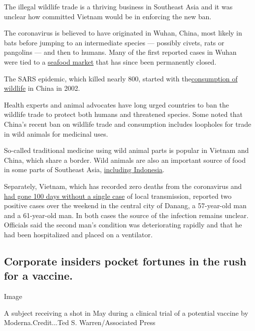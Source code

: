 The illegal wildlife trade is a thriving business in Southeast Asia and
it was unclear how committed Vietnam would be in enforcing the new ban.

The coronavirus is believed to have originated in Wuhan, China, most
likely in bats before jumping to an intermediate species --- possibly
civets, rats or pangolins --- and then to humans. Many of the first
reported cases in Wuhan were tied to a
\href{https://www.nytimes3xbfgragh.onion/2020/02/01/world/asia/china-coronavirus.html}{seafood
market} that has since been permanently closed.

The SARS epidemic, which killed nearly 800, started with
the\href{https://www.nytimes3xbfgragh.onion/2020/02/19/health/coronavirus-animals-markets.html}{consumption
of wildlife} in China in 2002.

Health experts and animal advocates have long urged countries to ban the
wildlife trade to protect both humans and threatened species. Some noted
that China's recent ban on wildlife trade and consumption includes
loopholes for trade in wild animals for medicinal uses.

So-called traditional medicine using wild animal parts is popular in
Vietnam and China, which share a border. Wild animals are also an
important source of food in some parts of Southeast Asia,
\href{https://www.nytimes3xbfgragh.onion/2020/05/13/world/asia/coronavirus-bats-market-Indonesia.html}{including
Indonesia}.

Separately, Vietnam, which has recorded zero deaths from the coronavirus
and
\href{https://www.nytimes3xbfgragh.onion/2020/07/25/world/asia/coronavirus-vietnam.html}{had
gone 100 days without a single case} of local transmission, reported two
positive cases over the weekend in the central city of Danang, a
57-year-old man and a 61-year-old man. In both cases the source of the
infection remains unclear. Officials said the second man's condition was
deteriorating rapidly and that he had been hospitalized and placed on a
ventilator.

\hypertarget{corporate-insiders-pocket-fortunes-in-the-rush-for-a-vaccine}{%
\subsection{Corporate insiders pocket fortunes in the rush for a
vaccine.}\label{corporate-insiders-pocket-fortunes-in-the-rush-for-a-vaccine}}

Image

A subject receiving a shot in May during a clinical trial of a potential
vaccine by Moderna.Credit...Ted S. Warren/Associated Press

